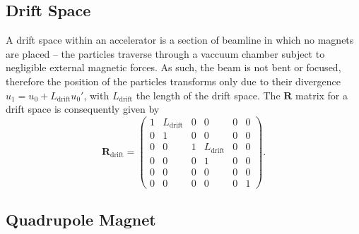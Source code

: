 \documentclass[../main.tex]{subfiles}
\begin{document}
\subsection{Drift Space}

A drift space within an accelerator is a section of beamline in which no magnets are placed -- the particles traverse through a vaccuum chamber subject to negligible external magnetic forces. As such, the beam is not bent or focused, therefore the position of the particles transforms only due to their divergence $u_{1} = u_{0} + L_{\mathrm{drift}}u_{0}'$, with $L_{\mathrm{drift}}$ the length of the drift space. The $\boldsymbol{R}$ matrix for a drift space is consequently given by  
\begin{equation}
\boldsymbol{R}_{\mathrm{drift}} =
\begin{pmatrix}
1 & L_{\mathrm{drift}} & 0 & 0 & 0 & 0 \\
0 & 1 & 0 & 0 & 0 & 0 \\
0 & 0 & 1 & L_{\mathrm{drift}} & 0 & 0 \\
0 & 0 & 0 & 1 & 0 & 0 \\
0 & 0 & 0 & 0 & 0 & 0 \\
0 & 0 & 0 & 0 & 0 & 1
\end{pmatrix}.
\label{eq:drift_matrix}    
\end{equation}

\subsection{Quadrupole Magnet}
\end{document}
